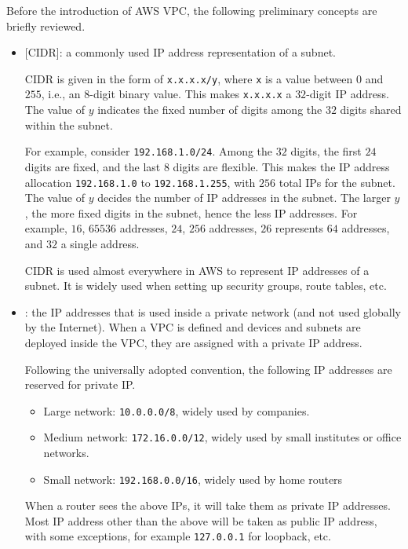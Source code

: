 Before the introduction of AWS VPC, the following preliminary concepts are briefly reviewed.
\begin{itemize}
	\item {}[CIDR]: a commonly used IP address representation of a subnet. 
	
	CIDR is given in the form of \verb|x.x.x.x/y|, where \verb|x| is a value between $0$ and $255$, i.e., an $8$-digit binary value. This makes \verb|x.x.x.x| a $32$-digit IP address. The value of $y$ indicates the fixed number of digits among the $32$ digits shared within the subnet.
	
	For example, consider \texttt{192.168.1.0/24}. Among the $32$ digits, the first $24$ digits are fixed, and the last $8$ digits are flexible. This makes the IP address allocation \texttt{192.168.1.0} to \texttt{192.168.1.255}, with $256$ total IPs for the subnet. The value of $y$ decides the number of IP addresses in the subnet. The larger $y$, the more fixed digits in the subnet, hence the less IP addresses. For example, $16$, $65536$ addresses, $24$, $256$ addresses, $26$ represents $64$ addresses, and $32$ a single address.
	
	CIDR is used almost everywhere in AWS to represent IP addresses of a subnet. It is widely used when setting up security groups, route tables, etc.
	
	\item {}: the IP addresses that is used inside a private network (and not used globally by the Internet). When a VPC is defined and devices and subnets are deployed inside the VPC, they are assigned with a private IP address. 
	
	Following the universally adopted convention, the following IP addresses are reserved for private IP.
	\begin{itemize}
		\item Large network: \texttt{10.0.0.0/8}, widely used by companies.
		\item Medium network: \texttt{172.16.0.0/12}, widely used by small institutes or office networks.
		\item Small network: \texttt{192.168.0.0/16}, widely used by home routers
	\end{itemize}
	When a router sees the above IPs, it will take them as private IP addresses. Most IP address other than the above will be taken as public IP address, with some exceptions, for example \texttt{127.0.0.1} for loopback, etc.
	

\end{itemize}
